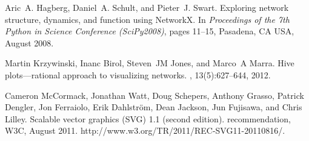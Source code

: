\documentclass{bioinfo}
\begin{document}
\begin{thebibliography}{3}

Aric~A. Hagberg, Daniel~A. Schult, and Pieter~J. Swart.
\newblock Exploring network structure, dynamics, and function using {NetworkX}.
\newblock In {\em Proceedings of the 7th Python in Science Conference
  (SciPy2008)}, pages 11--15, Pasadena, CA USA, August 2008.

Martin Krzywinski, Inanc Birol, Steven~JM Jones, and Marco~A Marra.
\newblock Hive plots—rational approach to visualizing networks.
, 13(5):627--644, 2012.

Cameron McCormack, Jonathan Watt, Doug Schepers, Anthony Grasso, Patrick
  Dengler, Jon Ferraiolo, Erik Dahlstr{\"{o}}m, Dean Jackson, Jun Fujisawa, and
  Chris Lilley.
\newblock Scalable vector graphics ({SVG}) {1.1} (second edition).
 recommendation, W3C, August 2011.
\newblock http://www.w3.org/TR/2011/REC-SVG11-20110816/.

\end{thebibliography}
\end{document}
